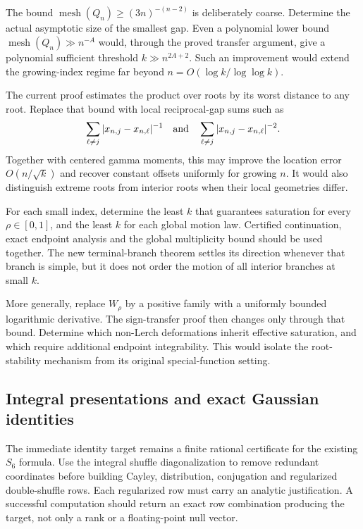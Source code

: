 \documentclass[11pt,letterpaper]{article}
\theoremstyle{definition}
\theoremstyle{remark}
\begin{document}
The bound $\operatorname{mesh}(Q_n)\ge(3n)^{-(n-2)}$ is deliberately
coarse. Determine the actual asymptotic size of the smallest gap. Even a
polynomial lower bound $\operatorname{mesh}(Q_n)\gg n^{-A}$ would, through
the proved transfer argument, give a polynomial sufficient threshold
$k\gg n^{2A+2}$. Such an improvement would extend the growing-index regime
far beyond $n=O(\log k/\log\log k)$.

The current proof estimates the product over roots by its worst distance
to any root. Replace that bound with local reciprocal-gap sums such as
\[
 \sum_{\ell\ne j}|x_{n,j}-x_{n,\ell}|^{-1}
 \quad\hbox{and}\quad
 \sum_{\ell\ne j}|x_{n,j}-x_{n,\ell}|^{-2}.
\]
Together with centered gamma moments, this may improve the location
error $O(n/\sqrt{k})$ and recover constant offsets uniformly for growing
$n$. It would also distinguish extreme roots from interior roots when
their local geometries differ.

For each small index, determine the least $k$ that guarantees saturation
for every $\rho\in[0,1]$, and the least $k$ for each global motion law.
Certified continuation, exact endpoint analysis and the global
multiplicity bound should be used together. The new terminal-branch
theorem settles its direction whenever that branch is simple, but it
does not order the motion of all interior branches at small $k$.

More generally, replace $W_\rho$ by a positive family with a uniformly
bounded logarithmic derivative. The sign-transfer proof then changes
only through that bound. Determine which non-Lerch deformations inherit
effective saturation, and which require additional endpoint integrability.
This would isolate the root-stability mechanism from its original
special-function setting.

\subsection{Integral presentations and exact Gaussian identities}

The immediate identity target remains a finite rational certificate for
the existing $S_6$ formula. Use the integral shuffle diagonalization to
remove redundant coordinates before building Cayley, distribution,
conjugation and regularized double-shuffle rows. Each regularized row
must carry an analytic justification. A successful computation should
return an exact row combination producing the target, not only a rank
or a floating-point null vector.
\end{document}
